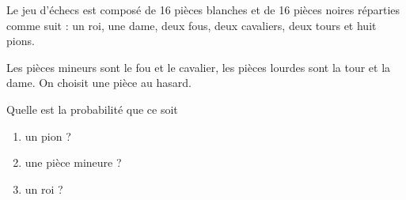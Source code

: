 
Le jeu d'échecs est composé de 16 pièces blanches et de 16 pièces noires réparties comme suit : un roi, une dame, deux fous, deux cavaliers, deux tours et huit pions.

Les pièces mineurs sont le fou et le cavalier, les pièces lourdes sont la tour et la dame. On choisit une pièce au hasard.


Quelle est la probabilité que ce soit
\begin{enumerate}
\item un pion ?
\item une pièce mineure ?
\item un roi ?
\end{enumerate}